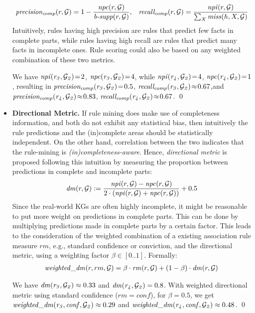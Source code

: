 \begin{itemize}
\begin{align*}
\mathit{precision_{comp}}(r,\mathcal{G})=1-\frac{\mathit{npc}(r,\mathcal{G})}{\textit{b-supp}(r,\mathcal{G})},\;\;\;
\mathit{recall_{comp}}(r,\mathcal{G})=\frac{\mathit{npi}(r,\mathcal{G})}{\sum_X \mathit{miss}(h,X,\mathcal{G})}
\end{align*}
Intuitively, rules having high precision are rules that predict few facts in complete parts, while rules having high recall are rules that predict many facts in incomplete ones. Rule scoring could also be based on any weighted combination of these two metrics.
\begin{example}
We have $\mathit{npi(r_3, \mathcal{G}_2)}\!=\!2$, $\mathit{npc(r_3, \mathcal{G}_2)}\!=\!4$, while $\mathit{npi(r_4,\mathcal{G}_2)}\!=\!4$, $\mathit{npc(r_4,\mathcal{G}_2)}\!=\!1$, resulting in $\mathit{precision_{comp}(r_3,\mathcal{G}_2)}\!=\!0.5$, $\mathit{recall_{comp}(r_3,\mathcal{G}_2)}\!\approx\!0.67$,and $\mathit{precision_{comp}(r_4,\mathcal{G}_2)}\!\approx\!0.83$, $\mathit{recall_{comp}(r_4,\mathcal{G}_2)}\!\approx\!0.67$.
\qed
\end{example}
\item \textbf{Directional Metric.} If rule mining does make use of completeness information, and both do not exhibit any statistical bias, then intuitively the rule predictions and the (in)complete areas should be statistically independent. On the other hand, correlation between the two indicates that the rule-mining is \emph{(in)completeness-aware}. Hence, \emph{directional metric} is proposed following this intuition by measuring the proportion between predictions in complete and incomplete parts:
\begin{align*}
\mathit{dm}(r,\mathcal{G}) := \frac{\mathit{npi}(r,\mathcal{G})-\mathit{npc}(r,\mathcal{G})}{2\cdot(\mathit{npi}(r,\mathcal{G})+\mathit{npc}(r,\mathcal{G}))}+0.5
\end{align*}
Since the real-world KGs are often highly incomplete, it might be reasonable to put more weight on predictions in complete parts. This can be done by multiplying predictions made in complete parts by a certain factor. This leads to the consideration of the weighted combination of a existing association rule measure $rm$, e.g., standard confidence or conviction, and 
the directional metric, using a weighting factor $\beta \in [0..1]$. Formally:
\begin{align*}
\mathit{weighted\_dm}(r,rm,\mathcal{G})=\beta \cdot \mathit{rm}(r,\mathcal{G}) + (1-\beta) \cdot \mathit{dm}(r,\mathcal{G}) 
\end{align*}
\begin{example}
We have $\mathit{dm(r_3,\mathcal{G}_2)}\approx 0.33$ and $\mathit{dm(r_4,\mathcal{G}_2)}=0.8$. With weighted directional metric using standard confidence ($rm = conf$), for $\beta=0.5$, we get $\mathit{weighted\_dm(r_3,conf,\mathcal{G}_2)} \approx 0.29$ and $\mathit{weighted\_dm(r_4,conf,\mathcal{G}_2)} \approx 0.48$. \qed
\end{example}
\end{itemize}
